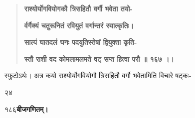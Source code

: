 \documentclass[11pt, openany]{book}
\begin{document}
\begin{sloppypar}
\begin{quote}
\hspace{1in}\textbf{राश्योर्योगवियोगकौ त्रिसहितौ वर्गौ भवेता तयो-}

\hspace{1in}\textbf{र्वर्गैक्यं चतुरूनितं रवियुतं वर्गान्तरं स्यात्कृतिः।}

\hspace{1in}\textbf{साल्पं घातदलं घनः पदयुतिस्तेषां द्वियुक्ता कृति-}

\hspace{1in}\textbf{स्तौ राशी वद कोमलामलमते षट् सप्त हित्वा परौ ॥ १६७ ।।}
\end{quote}

\hangindent=0.2in \hspace{0.2in}स्फुटोऽर्थः। अत्र कयो राश्योर्योगवियोगौ त्रिसहितौ वर्गौ भवेतामिति विचारे षट्कः-

\hspace{0.5in}२४
\end{sloppypar}
\thispagestyle{empty}
\newpage

\onehalfspacing
१८६\hspace{2in}\textbf{बीजगणितम्।} 

\vspace{5mm}
\end{document}
